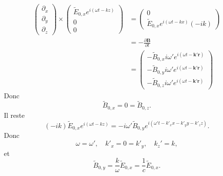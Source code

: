 \begin{align*}
\begin{pmatrix}
\partial _{x} \\
\partial _{y} \\
\partial _{z}
\end{pmatrix}\times \begin{pmatrix}
\tilde{E}_{0,x}e^{ i(\omega t-kz) } \\
0 \\
0
\end{pmatrix} & =\begin{pmatrix}
0 \\
\tilde{E}_{0,x}e^{ i(\omega t-kx) }(-ik)
\end{pmatrix} \\
 & =-\frac{ \partial \boldsymbol{B} }{ \partial t } \\
 & =\begin{pmatrix}
-\tilde{B}_{0,x}i\omega'e^{ i(\omega t-\boldsymbol{k}'\boldsymbol{r}) } \\
-\tilde{B}_{0,y}i\omega'e^{ i(\omega t-\boldsymbol{k}'\boldsymbol{r})} \\
-\tilde{B}_{0,z}i\omega'e^{ i(\omega t-\boldsymbol{k}'\boldsymbol{r}) } 
\end{pmatrix} 
\end{align*}
Donc 
$$
\tilde{B}_{0,x}=0=\tilde{B}_{0,z}.
$$
Il reste 
$$
(-ik)\tilde{E}_{0,x}e^{ i(\omega t-kz) }=-i\omega'\tilde{B}_{0,y}e^{ i(\omega't-k'_{x}x-k'_{y}y-k'_{z}z) }.
$$
Donc
$$
\omega=\omega',\quad k'_{x}=0=k'_{y},\quad k_{z}'=k,
$$
et
$$
\tilde{B}_{0,y}=\frac{k}{\omega}\tilde{E}_{0,x}=\frac{1}{c}\tilde{E}_{0,x}.
$$

